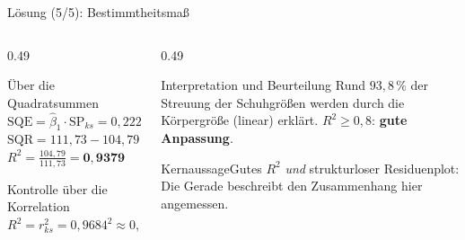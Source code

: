 \documentclass[aspectratio=169,11pt]{beamer}
\newcommand{\kernaussage}[1]{\begin{alertblock}{Kernaussage}#1\end{alertblock}}
\newcommand{\SPks}{\text{SP}_{ks}}
\begin{document}
\begin{frame}{Lösung (5/5): Bestimmtheitsmaß}
  \begin{columns}[T]
    \begin{column}{0.49\textwidth}
      \begin{block}{Über die Quadratsummen}
        $\text{SQE} = \hat{\beta}_1 \cdot \SPks = 0{,}2222 \cdot 471{,}6 = 104{,}79$\\[3pt]
        $\text{SQR} = 111{,}73 - 104{,}79 = 6{,}94$\\[3pt]
        $R^{2} = \frac{104{,}79}{111{,}73} = \mathbf{0{,}9379}$
      \end{block}
      \begin{block}{Kontrolle über die Korrelation}
        $R^{2} = r_{ks}^{2} = 0{,}9684^{2} \approx 0{,}938$ \checkmark
      \end{block}
    \end{column}
    \begin{column}{0.49\textwidth}
      \begin{exampleblock}{Interpretation und Beurteilung}
        Rund $93{,}8\,\%$ der Streuung der Schuhgrößen werden durch die
        Körpergröße (linear) erklärt. $R^{2} \ge 0{,}8$: \textbf{gute Anpassung}.
      \end{exampleblock}
      \kernaussage{Gutes $R^{2}$ \emph{und} strukturloser Residuenplot: Die
        Gerade beschreibt den Zusammenhang hier angemessen.}
    \end{column}
  \end{columns}
\end{frame}

\end{document}
